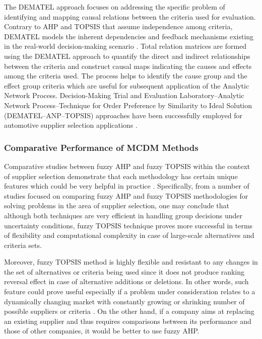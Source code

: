 \documentclass[11pt]{article}
\begin{document}
The DEMATEL approach focuses on addressing the specific problem of identifying and mapping causal relations between the criteria used for evaluation. Contrary to AHP and TOPSIS that assume independence among criteria, DEMATEL models the inherent dependencies and feedback mechanisms existing in the real-world decision-making scenario \cite{ref24,ref31}. Total relation matrices are formed using the DEMATEL approach to quantify the direct and indirect relationships between the criteria and construct causal maps indicating the causes and effects among the criteria used. The process helps to identify the cause group and the effect group criteria \cite{ref31} which are useful for subsequent application of the Analytic Network Process. Decision-Making Trial and Evaluation Laboratory--Analytic Network Process--Technique for Order Preference by Similarity to Ideal Solution (DEMATEL--ANP--TOPSIS) approaches have been successfully employed for automotive supplier selection applications \cite{ref31}.

\subsubsection{Comparative Performance of MCDM Methods}

Comparative studies between fuzzy AHP and fuzzy TOPSIS within the context of supplier selection demonstrate that each methodology has certain unique features which could be very helpful in practice \cite{ref35}. Specifically, from a number of studies focused on comparing fuzzy AHP and fuzzy TOPSIS methodologies for solving problems in the area of supplier selection, one may conclude that although both techniques are very efficient in handling group decisions under uncertainty conditions, fuzzy TOPSIS technique proves more successful in terms of flexibility and computational complexity in case of large-scale alternatives and criteria sets.

Moreover, fuzzy TOPSIS method is highly flexible and resistant to any changes in the set of alternatives or criteria being used since it does not produce ranking reversal effect in case of alternative additions or deletions. In other words, such feature could prove useful especially if a problem under consideration relates to a dynamically changing market with constantly growing or shrinking number of possible suppliers or criteria \cite{ref35}. On the other hand, if a company aims at replacing an existing supplier and thus requires comparisons between its performance and those of other companies, it would be better to use fuzzy AHP.
\end{document}
